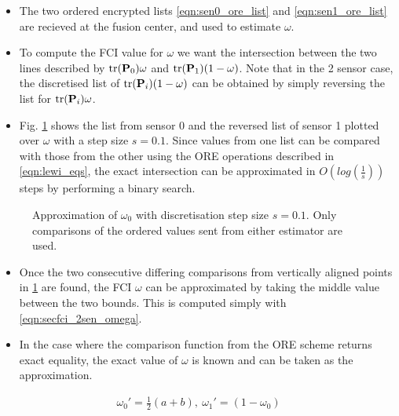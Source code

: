\documentclass[letterpaper, 10 pt, conference]{ieeeconf}  %
\begin{document}
\begin{itemize}
   \item The two ordered encrypted lists \eqref{eqn:sen0_ore_list} and \eqref{eqn:sen1_ore_list} are recieved at the fusion center, and used to estimate $\omega$.
   \item To compute the FCI value for $\omega$ we want the intersection between the two lines described by $\operatorname{tr}({{\mathbf{P}}}_0)\omega$ and $\operatorname{tr}({{\mathbf{P}}}_1)(1-\omega)$. Note that in the 2 sensor case, the discretised list of $\operatorname{tr}({{\mathbf{P}}}_i)(1-\omega)$ can be obtained by simply reversing the list for $\operatorname{tr}({{\mathbf{P}}}_i)\omega$.
   \item Fig. \ref{fig:2_sensor_sol} shows the list from sensor 0 and the reversed list of sensor 1 plotted over $\omega$ with a step size $s=0.1$. Since values from one list can be compared with those from the other using the ORE operations described in \eqref{eqn:lewi_eqs}, the exact intersection can be approximated in $O(log(\frac{1}{s}))$ steps by performing a binary search.
\end{itemize}
\begin{figure}[tb]
   \begin{center}
      
   \end{center}
   \caption{Approximation of $\omega_0$ with discretisation step size $s=0.1$. Only comparisons of the ordered values sent from either estimator are used.}
   \label{fig:2_sensor_sol}
\end{figure}
\begin{itemize}
   \item Once the two consecutive differing comparisons from vertically aligned points in \ref{fig:2_sensor_sol} are found, the FCI $\omega$ can be approximated by taking the middle value between the two bounds. This is computed simply with \eqref{eqn:secfci_2sen_omega}.
   \item In the case where the comparison function from the ORE scheme returns exact equality, the exact value of $\omega$ is known and can be taken as the approximation.
\end{itemize}
\begin{gather}
   \omega_0'=\frac{1}{2}(a + b),\ \omega_1' = (1-\omega_0) \label{eqn:secfci_2sen_omega}
\end{gather}

\end{document}
